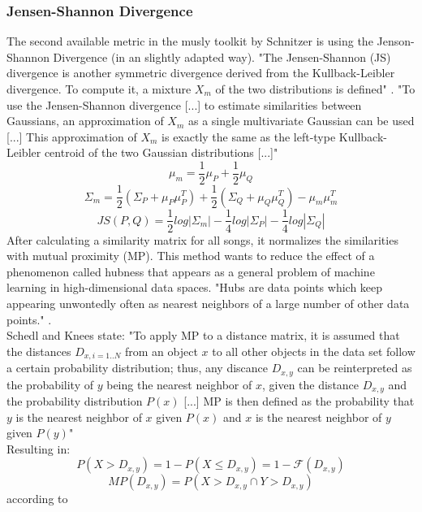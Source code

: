 \subsubsection{Jensen-Shannon Divergence}
The second available metric in the musly toolkit by Schnitzer is using the Jenson-Shannon Divergence (in an slightly adapted way). "The Jensen-Shannon (JS) divergence is another symmetric divergence derived from the Kullback-Leibler divergence. To compute it, a mixture $X_m$ of the two distributions is defined" \cite[p. 43]{schnitzer1}. "To use the Jensen-Shannon divergence [...] to estimate similarities between Gaussians, an approximation of $X_m$ as a single multivariate Gaussian can be used [...] This approximation of $X_m$ is exactly the same as the left-type Kullback-Leibler centroid of the two Gaussian distributions [...]" \cite[p. 44]{schnitzer1} 
\begin{equation} \label{eq:jsl1}
\mu_m = \frac{1}{2} \mu_P + \frac{1}{2} \mu_Q
\end{equation}
\begin{equation} \label{eq:jsl2}
\Sigma_m = \frac{1}{2} (\Sigma_P + \mu_P\mu_P^T) + \frac{1}{2} (\Sigma_Q + \mu_Q\mu_Q^T) - \mu_m\mu_m^T
\end{equation}
\begin{equation} \label{eq:jsl3}
JS(P, Q) = \frac{1}{2} log|\Sigma_m| - \frac{1}{4} log |\Sigma_P| - \frac{1}{4} log |\Sigma_Q|
\end{equation}
After calculating a similarity matrix for all songs, it normalizes the similarities with mutual proximity (MP). \cite{musly2}  This method wants to reduce the effect of a phenomenon called hubness that appears as a general problem of machine learning in high-dimensional data spaces. "Hubs are data points which keep appearing unwontedly often as nearest neighbors of a large number of other data points." \cite[p. 66]{schnitzer1}.\\
Schedl and Knees state: "To apply MP to a distance matrix, it is assumed that the distances $D_{x,i = 1..N}$ from an object $x$ to all other objects in the data set follow a certain probability distribution; thus, any discance $D_{x,y}$ can be reinterpreted as the probability of $y$ being the nearest neighbor of $x$, given the distance $D_{x,y}$ and the probability distribution $P(x)$ [...] MP is then defined as the probability that $y$ is the nearest neighbor of $x$ given $P(x)$ and $x$ is the nearest neighbor of $y$ given $P(y)$" \cite[p. 80]{knees1}\\
Resulting in: 
\begin{equation} \label{eq:mp1}
P(X > D_{x,y}) = 1 - P(X \leq D_{x,y}) = 1 - \mathscr{F}(D_{x,y}) 
\end{equation}
\begin{equation} \label{eq:mp2}
MP(D_{x,y}) = P(X > D_{x,y} \cap Y > D_{x,y})
\end{equation}
according to \cite[p. 80]{knees1}

